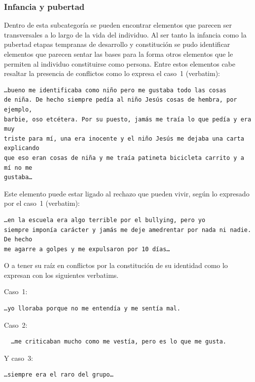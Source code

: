 \subsubsection{Infancia y pubertad}
Dentro de esta subcategoría se pueden
encontrar elementos que parecen ser transversales a lo largo de la vida del
individuo. Al ser tanto la infancia como la pubertad etapas tempranas de
desarrollo y constitución se pudo identificar elementos que parecen sentar las
bases para la forma otros elementos que le permiten al individuo constituirse
como persona. Entre estos elementos cabe resaltar la presencia de conflictos
como lo expresa el caso~1 (verbatim):

\begin{verbatim}
…bueno me identificaba como niño pero me gustaba todo las cosas
de niña. De hecho siempre pedía al niño Jesús cosas de hembra, por ejemplo,
barbie, oso etcétera. Por su puesto, jamás me traía lo que pedía y era muy
triste para mí, una era inocente y el niño Jesús me dejaba una carta explicando
que eso eran cosas de niña y me traía patineta bicicleta carrito y a mí no me
gustaba…
\end{verbatim}

Este elemento puede estar ligado al rechazo que pueden vivir, según lo expresado
por el caso~1 (verbatim):

\begin{verbatim}
…en la escuela era algo terrible por el bullying, pero yo
siempre imponía carácter y jamás me deje amedrentar por nada ni nadie. De hecho
me agarre a golpes y me expulsaron por 10 días…
\end{verbatim}

O a tener su raíz en conflictos por la constitución de su identidad como lo
expresan con los siguientes verbatims.

Caso~1:

\begin{verbatim}
…yo lloraba porque no me entendía y me sentía mal.
\end{verbatim}

Caso~2:

\begin{verbatim}
  …me criticaban mucho como me vestía, pero es lo que me gusta.
\end{verbatim}

Y caso~3:

\begin{verbatim}
…siempre era el raro del grupo…
\end{verbatim}

